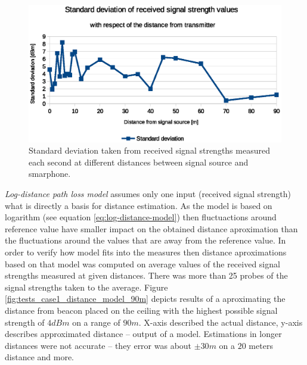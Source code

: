 \documentclass[../main.tex]{subfiles}
\begin{document}
\begin{figure}[!htbp]
\includegraphics[width=\textwidth, keepaspectratio]{pictures/tests_case1_fluctuations_over_time_std_dev}
\centering
\caption{Standard deviation taken from received signal strengths measured each second at different distances between signal source and smarphone.}
\label{fig:tests_case1_fluctuations_over_time_std_dev}
\end{figure}

\textit{Log-distance path loss model} assumes only one input (received signal strength) what is directly a basis for distance estimation. As the model is based on logarithm (see equation \ref{eq:log-distance-model}) then fluctuactions around reference value have smaller impact on the obtained distance aproximation than the fluctuations around the values that are away from the reference value. In order to verify how model fits into the measures then distance aproximations based on that model was computed on average values of the received signal strengths measured at given distances. There was more than 25 probes of the signal strengths taken to the average. Figure \ref{fig:tests_case1_distance_model_90m} depicts results of a aproximating the distance from beacon placed on the ceiling with the highest possible signal strength of $4dBm$ on a range of $90 m$. X-axis described the actual distance, y-axis describes approximated distance -- output of a model. Estimations in longer distances were not accurate -- they error was about $\pm 30m$ on a $20$ meters distance and more.
\end{document}
